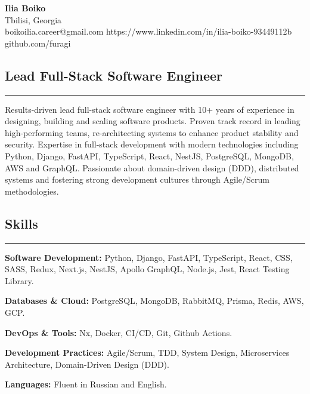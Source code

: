 \documentclass[11pt,letterpaper]{article}
\begin{document}
\begin{center}
	{\LARGE \textbf{Ilia Boiko}}
	\\ Tbilisi, Georgia
	\vspace{0.05cm}
	\\
	\raisebox{-0.2\height}{\Large \faEnvelopeSquare} boikoilia.career@gmail.com \hfill \raisebox{-0.2\height}{\Large \faLinkedin} https://www.linkedin.com/in/ilia-boiko-93449112b \hfill \raisebox{-0.2\height}{\Large \faGithubSquare} github.com/furagi \hfill 
\end{center}

\subsection*{\Large Lead Full-Stack Software Engineer}
\vspace{-.5em}
\hrule
\vspace{1em}
Results-driven lead full-stack software engineer with 10+ years of experience in designing, building and scaling software products. Proven track record in leading high-performing teams, re-architecting systems to enhance product stability and security. Expertise in full-stack development with modern technologies including Python, Django, FastAPI, TypeScript, React, NestJS, PostgreSQL, MongoDB, AWS and GraphQL. Passionate about domain-driven design (DDD), distributed systems and fostering strong development cultures through Agile/Scrum methodologies.

\subsection*{\Large Skills}
\vspace{-.5em}
\hrule
\vspace{1em}
\begin{itemize*}
	\item {\textbf{Software Development:}} Python, Django, FastAPI, TypeScript, React, CSS, SASS, Redux, Next.js, NestJS, Apollo GraphQL,  Node.js, Jest, React Testing Library.
	\item {\textbf{Databases \& Cloud:}} PostgreSQL, MongoDB, RabbitMQ, Prisma, Redis, AWS, GCP.
	\item {\textbf{DevOps \& Tools:}} Nx, Docker, CI/CD, Git, Github Actions.
	\item {\textbf{Development Practices:}} Agile/Scrum, TDD, System Design, Microservices Architecture, Domain-Driven Design (DDD).
	\item {\textbf{Languages:}} Fluent in Russian and English.
\end{itemize*}
\end{document}
